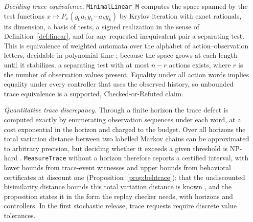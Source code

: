 \documentclass[11pt]{article}
\newcommand{\code}[1]{\texttt{#1}}
\theoremstyle{definition}
\theoremstyle{plain}
\begin{document}
\emph{Deciding trace equivalence.} \code{MinimalLinear M} computes the space spanned by the test
functions $x\mapsto P_x(y_0a_1y_1\cdots a_ky_k)$ by Krylov iteration with exact rationals, its
dimension, a basis of tests, a signed realization in the sense of Definition~\ref{def:linear}, and
for any requested inequivalent pair a separating test. This is equivalence of weighted automata
over the alphabet of action--observation letters, decidable in polynomial time
\cite{schutzenberger,tzeng,kiefer}; because the space grows at each length until it stabilizes, a
separating test with at most $n-r$ actions exists, where $r$ is the number of observation values
present. Equality under all action words implies equality under every controller that uses the
observed history, so unbounded trace equivalence is a supported, Checked-or-Refuted claim.

\emph{Quantitative trace discrepancy.} Through a finite horizon the trace defect is computed
exactly by enumerating observation sequences under each word, at a cost exponential in the horizon
and charged to the budget. Over all horizons the total variation distance between two labelled
Markov chains can be approximated to arbitrary precision, but deciding whether it exceeds a given
threshold is NP-hard \cite{chenkiefer}. \code{MeasureTrace} without a horizon therefore reports a
certified interval, with lower bounds from trace-event witnesses and upper bounds from behavioral
certificates at discount one (Proposition~\ref{prop:behtrace}); that the undiscounted
bisimilarity distance bounds this total variation distance is known \cite{chenkiefer}, and the
proposition states it in the form the replay checker needs, with horizons and controllers. In the
first stochastic release, trace requests require discrete value tolerances.
\end{document}
